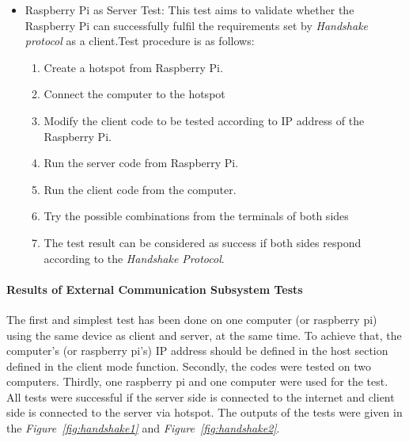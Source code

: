 \documentclass[a4paper,12pt]{article}
\begin{document}
\begin{itemize}
		\item Raspberry Pi as Server Test:
			This test aims to validate whether the Raspberry Pi can successfully fulfil the requirements set by \textit{Handshake protocol} as a client.Test procedure is as follows:
			\begin{enumerate}
				\item Create a hotspot from Raspberry Pi. \vspace{-0.2cm}
				\item Connect the computer to the hotspot \vspace{-0.2cm}
				\item Modify the client code to be tested according to IP address of the Raspberry Pi. \vspace{-0.2cm}
				\item Run the server code from Raspberry Pi. \vspace{-0.2cm}
				\item Run the client code from the computer. \vspace{-0.2cm}
				\item Try the possible combinations from the terminals of both sides \vspace{-0.2cm}
				\item The test result can be considered as success if both sides respond according to the \textit{Handshake Protocol}. 
			\end{enumerate}	
		
		\end{itemize}
		

	\paragraph{Results of External Communication Subsystem Tests}
	
	 The first and simplest test has been done on one computer (or raspberry pi) using the same device as client and server, at the same time. To achieve that, the computer's (or raspberry pi’s) IP address should be defined in the host section defined in the client mode function. Secondly, the codes were tested on two computers. Thirdly, one raspberry pi and one computer were used for the test. All tests were successful if the server side is connected to the internet and client side is connected to the server via hotspot. The outputs of the tests were given in the \textit{Figure~\ref{fig:handshake1}} and \textit{Figure~\ref{fig:handshake2}}.
	
	
	
\end{document}
